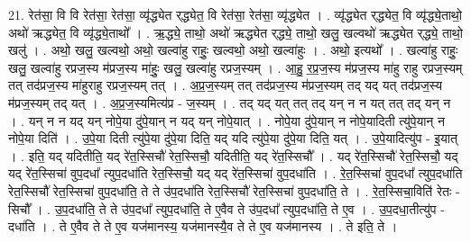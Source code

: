 \documentclass[17pt]{extarticle}
\begin{document}
21. रेत॑सा॒ वि वि रेत॑सा॒ रेत॑सा॒ व्यृ॑द्ध्येत र्‌द्ध्येत॒ वि रेत॑सा॒ रेत॑सा॒ व्यृ॑द्ध्येत । . व्यृ॑द्ध्येत र्‌द्ध्येत॒ वि व्यृ॑द्ध्ये॒ताथो॒ अथो॑ ऋद्ध्येत॒ वि व्यृ॑द्ध्ये॒ताथो᳚ । . ऋ॒द्ध्ये॒ ताथो॒ अथो॑ ऋद्ध्येत र्‌द्ध्ये॒ ताथो॒ खलु॒ खल्वथो॑ ऋद्ध्येत र्‌द्ध्ये॒ ताथो॒ खलु॑ । . अथो॒ खलु॒ खल्वथो॒ अथो॒ खल्वा॑हु राहुः॒ खल्वथो॒ अथो॒ खल्वा॑हुः । . अथो॒ इत्यथो᳚ । . खल्वा॑हु राहुः॒ खलु॒ खल्वा॑हु रप्रज॒स्य म॑प्रज॒स्य मा॑हुः॒ खलु॒ खल्वा॑हु रप्रज॒स्यम् । . आ॒हु॒ र॒प्र॒ज॒स्य म॑प्रज॒स्य मा॑हु राहु रप्रज॒स्यम् तत् तद॑प्रज॒स्य मा॑हुराहु रप्रज॒स्यम् तत् । . अ॒प्र॒ज॒स्यम् तत् तद॑प्रज॒स्य म॑प्रज॒स्यम् तद् यद् यत् तद॑प्रज॒स्य म॑प्रज॒स्यम् तद् यत् । . अ॒प्र॒ज॒स्यमित्य॑प्र - ज॒स्यम् । . तद् यद् यत् तत् तद् यन् न न यत् तत् तद् यन् न । . यन् न न यद् यन् नोपे॒या दु॑पे॒यान् न यद् यन् नोपे॒यात् । . नोपे॒या दु॑पे॒यान् न नोपे॒यादिती त्यु॑पे॒यान् न नोपे॒या दिति॑ । . उ॒पे॒या दिती त्यु॑पे॒या दु॑पे॒या दिति॒ यद् यदि त्यु॑पे॒या दु॑पे॒या दिति॒ यत् । . उ॒पे॒यादित्यु॑प - इ॒यात् । . इति॒ यद् यदितीति॒ यद् रे॑त॒स्सिचौ॑ रेत॒स्सिचौ॒ यदितीति॒ यद् रे॑त॒स्सिचौ᳚ । . यद् रे॑त॒स्सिचौ॑ रेत॒स्सिचौ॒ यद् यद् रे॑त॒स्सिचा॑ वुप॒दधा᳚ त्युप॒दधा॑ति रेत॒स्सिचौ॒ यद् यद् रे॑त॒स्सिचा॑ वुप॒दधा॑ति । . रे॒त॒स्सिचा॑ वुप॒दधा᳚ त्युप॒दधा॑ति रेत॒स्सिचौ॑ रेत॒स्सिचा॑ वुप॒दधा॑ति॒ ते ते उ॑प॒दधा॑ति रेत॒स्सिचौ॑ रेत॒स्सिचा॑ वुप॒दधा॑ति॒ ते । . रे॒त॒स्सिचा॒विति॑ रेतः - सिचौ᳚ । . उ॒प॒दधा॑ति॒ ते ते उ॑प॒दधा᳚ त्युप॒दधा॑ति॒ ते ए॒वैव ते उ॑प॒दधा᳚ त्युप॒दधा॑ति॒ ते ए॒व । . उ॒प॒दधा॒तीत्यु॑प - दधा॑ति । . ते ए॒वैव ते ते ए॒व यज॑मानस्य॒ यज॑मानस्यै॒व ते ते ए॒व यज॑मानस्य । . ते इति॒ ते । \newline
\end{document}
